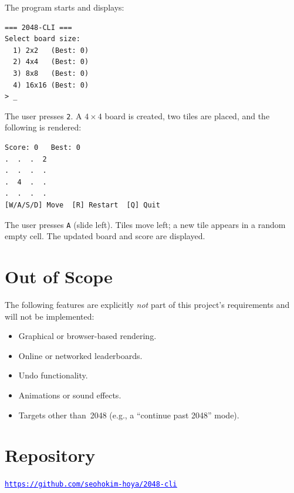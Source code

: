 \documentclass{article} %
\let\OriginalHref\href
\renewcommand{\href}[2]{%
	\OriginalHref{#1}{\textcolor{blue}{\uline{#2}}}%
}
\renewcommand{\url}[1]{%
	\href{#1}{\textcolor{blue}{\uline{\nolinkurl{#1}}}}%
}
\begin{document}
The program starts and displays:

\begin{lstlisting}
=== 2048-CLI ===
Select board size:
  1) 2x2   (Best: 0)
  2) 4x4   (Best: 0)
  3) 8x8   (Best: 0)
  4) 16x16 (Best: 0)
> _
\end{lstlisting}

The user presses \texttt{2}.
A $4{\times}4$ board is created, two tiles are placed, and the following is rendered:

\begin{lstlisting}
Score: 0   Best: 0
.  .  .  2
.  .  .  .
.  4  .  .
.  .  .  .
[W/A/S/D] Move  [R] Restart  [Q] Quit
\end{lstlisting}

The user presses \texttt{A} (slide left).
Tiles move left; a new tile appears in a random empty cell.
The updated board and score are displayed.

\section{Out of Scope}

The following features are explicitly \emph{not} part of this project's requirements
and will not be implemented:

\begin{itemize}[itemsep=2pt]
	\item Graphical or browser-based rendering.
	\item Online or networked leaderboards.
	\item Undo functionality.
	\item Animations or sound effects.
	\item Targets other than~2048 (e.g., a ``continue past 2048'' mode).
\end{itemize}

\section{Repository}

\url{https://github.com/seohokim-hoya/2048-cli}
\end{document}
